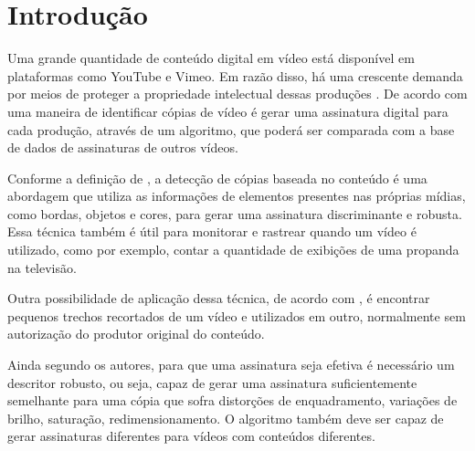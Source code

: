 
\chapter{Introdução}
\label{chap:introducao}


Uma grande quantidade de conteúdo digital em vídeo está disponível em plataformas como YouTube e Vimeo. Em razão disso, há uma crescente demanda por meios de proteger a propriedade intelectual dessas produções \citeauthor{hua2004robust}. De acordo com \citeauthor{kim2005spatiotemporal} uma maneira de identificar cópias de vídeo é gerar uma assinatura digital para cada produção, através de um algoritmo, que poderá ser comparada com a base de dados de assinaturas de outros vídeos.

	Conforme a definição de \citeauthor{kim2005spatiotemporal}, a detecção de cópias baseada no conteúdo é uma abordagem que utiliza as informações de elementos presentes nas próprias mídias, como bordas, objetos e cores, para gerar uma assinatura discriminante e robusta. Essa técnica também é útil para monitorar e rastrear quando um vídeo é utilizado, como por exemplo, contar a quantidade de exibições de uma propanda na televisão. 
    
    Outra possibilidade de aplicação dessa técnica, de acordo com \citeauthor{chen2008video}, é encontrar pequenos trechos recortados de um vídeo e utilizados em outro, normalmente sem autorização do produtor original do conteúdo.

    Ainda segundo os autores, para que uma assinatura seja efetiva é necessário um descritor robusto, ou seja, capaz de gerar uma assinatura suficientemente semelhante para uma cópia que sofra distorções de enquadramento, variações de brilho, saturação, redimensionamento. O algoritmo também deve ser capaz de gerar assinaturas diferentes para vídeos com conteúdos diferentes. 
    
